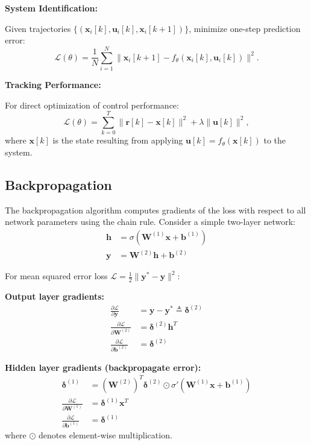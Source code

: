 \textbf{System Identification:}

Given trajectories $\{(\mathbf{x}_i[k], \mathbf{u}_i[k], \mathbf{x}_i[k+1])\}$, minimize one-step prediction error:
\begin{equation}
\mathcal{L}(\theta) = \frac{1}{N}\sum_{i=1}^{N} \|\mathbf{x}_i[k+1] - f_\theta(\mathbf{x}_i[k], \mathbf{u}_i[k])\|^2.
\label{eq:sysid_loss}
\end{equation}

\textbf{Tracking Performance:}

For direct optimization of control performance:
\begin{equation}
\mathcal{L}(\theta) = \sum_{k=0}^{T} \|\mathbf{r}[k] - \mathbf{x}[k]\|^2 + \lambda\|\mathbf{u}[k]\|^2,
\label{eq:tracking_loss}
\end{equation}
where $\mathbf{x}[k]$ is the state resulting from applying $\mathbf{u}[k] = f_\theta(\mathbf{x}[k])$ to the system.

\subsection{Backpropagation}

The backpropagation algorithm computes gradients of the loss with respect to all network parameters using the chain rule. Consider a simple two-layer network:
\begin{align}
\mathbf{h} &= \sigma(\mathbf{W}^{(1)}\mathbf{x} + \mathbf{b}^{(1)}) \\
\mathbf{y} &= \mathbf{W}^{(2)}\mathbf{h} + \mathbf{b}^{(2)}
\end{align}

For mean squared error loss $\mathcal{L} = \frac{1}{2}\|\mathbf{y}^* - \mathbf{y}\|^2$:

\textbf{Output layer gradients:}
\begin{align}
\frac{\partial \mathcal{L}}{\partial \mathbf{y}} &= \mathbf{y} - \mathbf{y}^* \triangleq \boldsymbol{\delta}^{(2)} \\
\frac{\partial \mathcal{L}}{\partial \mathbf{W}^{(2)}} &= \boldsymbol{\delta}^{(2)} \mathbf{h}^T \\
\frac{\partial \mathcal{L}}{\partial \mathbf{b}^{(2)}} &= \boldsymbol{\delta}^{(2)}
\end{align}

\textbf{Hidden layer gradients (backpropagate error):}
\begin{align}
\boldsymbol{\delta}^{(1)} &= (\mathbf{W}^{(2)})^T \boldsymbol{\delta}^{(2)} \odot \sigma'(\mathbf{W}^{(1)}\mathbf{x} + \mathbf{b}^{(1)}) \\
\frac{\partial \mathcal{L}}{\partial \mathbf{W}^{(1)}} &= \boldsymbol{\delta}^{(1)} \mathbf{x}^T \\
\frac{\partial \mathcal{L}}{\partial \mathbf{b}^{(1)}} &= \boldsymbol{\delta}^{(1)}
\end{align}
where $\odot$ denotes element-wise multiplication.

